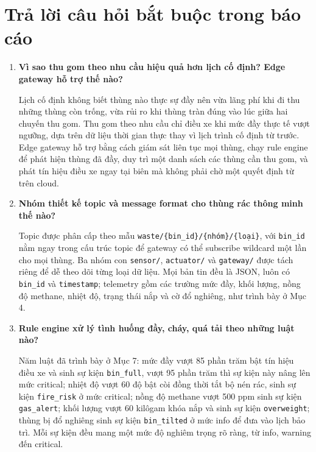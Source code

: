 \documentclass[12pt,a4paper]{article}
\begin{document}
\section{Trả lời câu hỏi bắt buộc trong báo cáo}

\begin{enumerate}
    \item \textbf{Vì sao thu gom theo nhu cầu hiệu quả hơn lịch cố định? Edge gateway hỗ trợ thế nào?}

    Lịch cố định không biết thùng nào thực sự đầy nên vừa lãng phí khi đi thu những thùng còn trống, vừa rủi ro khi thùng tràn đúng vào lúc giữa hai chuyến thu gom. Thu gom theo nhu cầu chỉ điều xe khi mức đầy thực tế vượt ngưỡng, dựa trên dữ liệu thời gian thực thay vì lịch trình cố định từ trước. Edge gateway hỗ trợ bằng cách giám sát liên tục mọi thùng, chạy rule engine để phát hiện thùng đã đầy, duy trì một danh sách các thùng cần thu gom, và phát tín hiệu điều xe ngay tại biên mà không phải chờ một quyết định từ trên cloud.

    \item \textbf{Nhóm thiết kế topic và message format cho thùng rác thông minh thế nào?}

    Topic được phân cấp theo mẫu \texttt{waste/\{bin\_id\}/\{nhóm\}/\{loại\}}, với \texttt{bin\_id} nằm ngay trong cấu trúc topic để gateway có thể subscribe wildcard một lần cho mọi thùng. Ba nhóm con \texttt{sensor/}, \texttt{actuator/} và \texttt{gateway/} được tách riêng để dễ theo dõi từng loại dữ liệu. Mọi bản tin đều là JSON, luôn có \texttt{bin\_id} và \texttt{timestamp}; telemetry gồm các trường mức đầy, khối lượng, nồng độ methane, nhiệt độ, trạng thái nắp và cờ đổ nghiêng, như trình bày ở Mục 4.

    \item \textbf{Rule engine xử lý tình huống đầy, cháy, quá tải theo những luật nào?}

    Năm luật đã trình bày ở Mục 7: mức đầy vượt 85 phần trăm bật tín hiệu điều xe và sinh sự kiện \texttt{bin\_full}, vượt 95 phần trăm thì sự kiện này nâng lên mức critical; nhiệt độ vượt 60 độ bật còi đồng thời tắt bộ nén rác, sinh sự kiện \texttt{fire\_risk} ở mức critical; nồng độ methane vượt 500 ppm sinh sự kiện \texttt{gas\_alert}; khối lượng vượt 60 kilôgam khóa nắp và sinh sự kiện \texttt{overweight}; thùng bị đổ nghiêng sinh sự kiện \texttt{bin\_tilted} ở mức info để đưa vào lịch bảo trì. Mỗi sự kiện đều mang một mức độ nghiêm trọng rõ ràng, từ info, warning đến critical.


\end{enumerate}
\end{document}
